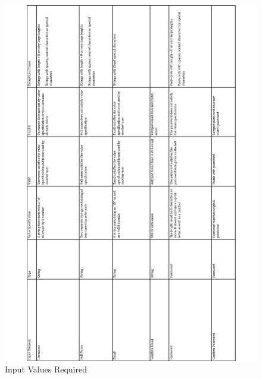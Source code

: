 \documentclass[english]{article}
\begin{document}
\begin{figure}[H]
\centering
\includegraphics[width=1.0\textwidth]{1.1}
\caption{Input Values Required}
\end{figure}
\end{document}
